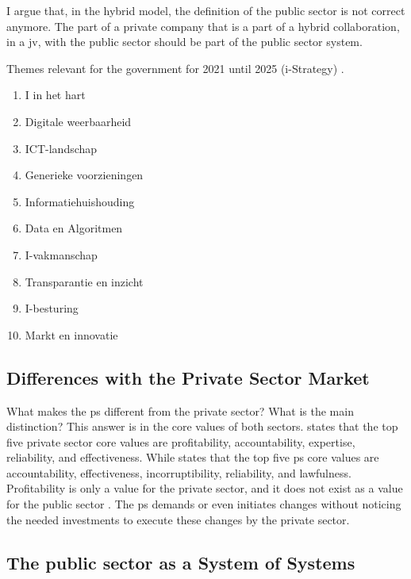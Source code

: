 I argue that, in the hybrid model, the definition of the public sector is not correct anymore. The part of a private company that is a part of a hybrid collaboration, in a \gls{jv}, with the public sector should be part of the public sector system.

Themes relevant for the government for 2021 until 2025 (i-Strategy) \parencite{Digitaleoverheid}.

\begin{enumerate}
	\item{I in het hart}
	\item{Digitale weerbaarheid}
	\item{ICT-landschap}
	\item{Generieke voorzieningen}
	\item{Informatiehuishouding}
	\item{Data en Algoritmen}
	\item{I-vakmanschap}
	\item{Transparantie en inzicht}
	\item{I-besturing}
	\item{Markt en innovatie}
\end{enumerate}


\subsection{Differences with the Private Sector Market}
\label{sub:tbdifferenceprivatesector}
What makes the \gls{ps} different from the private sector? What is the main distinction? This answer is in the core values of both sectors. \textcite{Wal2008} states that the top five private sector core values are profitability, accountability, expertise, reliability, and effectiveness. While \textcite{Wal2008} states that the top five \gls{ps} core values are accountability, effectiveness, incorruptibility, reliability, and lawfulness. Profitability is only a value for the private sector, and it does not exist as a value for the public sector \parencite{Wal2008}. The \gls{ps} demands or even initiates changes without noticing the needed investments to execute these changes by the private sector.

\subsection{The public sector as a System of Systems}
\label{sub:tbpssystemofsystems}

